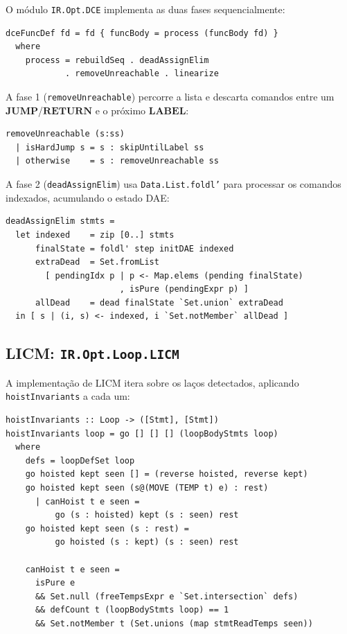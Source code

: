 O módulo \texttt{IR.Opt.DCE} implementa as duas fases sequencialmente:

\begin{verbatim}
dceFuncDef fd = fd { funcBody = process (funcBody fd) }
  where
    process = rebuildSeq . deadAssignElim
            . removeUnreachable . linearize
\end{verbatim}

A fase 1 (\texttt{removeUnreachable}) percorre a lista e descarta comandos
entre um $\mathbf{JUMP}$/$\mathbf{RETURN}$ e o próximo $\mathbf{LABEL}$:

\begin{verbatim}
removeUnreachable (s:ss)
  | isHardJump s = s : skipUntilLabel ss
  | otherwise    = s : removeUnreachable ss
\end{verbatim}

A fase 2 (\texttt{deadAssignElim}) usa \texttt{Data.List.foldl'} para processar
os comandos indexados, acumulando o estado DAE:

\begin{verbatim}
deadAssignElim stmts =
  let indexed    = zip [0..] stmts
      finalState = foldl' step initDAE indexed
      extraDead  = Set.fromList
        [ pendingIdx p | p <- Map.elems (pending finalState)
                       , isPure (pendingExpr p) ]
      allDead    = dead finalState `Set.union` extraDead
  in [ s | (i, s) <- indexed, i `Set.notMember` allDead ]
\end{verbatim}

\subsection{LICM: \texttt{IR.Opt.Loop.LICM}}\label{sec:impl-licm}

A implementação de LICM itera sobre os laços detectados, aplicando
\texttt{hoistInvariants} a cada um:

\begin{verbatim}
hoistInvariants :: Loop -> ([Stmt], [Stmt])
hoistInvariants loop = go [] [] [] (loopBodyStmts loop)
  where
    defs = loopDefSet loop
    go hoisted kept seen [] = (reverse hoisted, reverse kept)
    go hoisted kept seen (s@(MOVE (TEMP t) e) : rest)
      | canHoist t e seen =
          go (s : hoisted) kept (s : seen) rest
    go hoisted kept seen (s : rest) =
          go hoisted (s : kept) (s : seen) rest

    canHoist t e seen =
      isPure e
      && Set.null (freeTempsExpr e `Set.intersection` defs)
      && defCount t (loopBodyStmts loop) == 1
      && Set.notMember t (Set.unions (map stmtReadTemps seen))
\end{verbatim}

